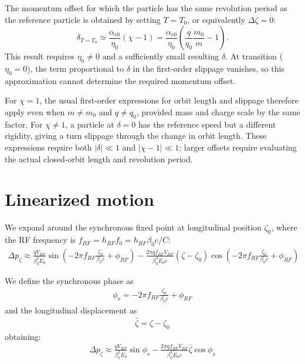 The momentum offset for which the particle has the same revolution period as
the reference particle is obtained by setting $T=T_0$, or equivalently
$\Delta\zeta=0$:
\begin{equation}
\boxed{
\delta_{T=T_0}\simeq\frac{\alpha_{c0}}{\eta_0}(\chi-1)
=\frac{\alpha_{c0}}{\eta_0}
\left(\frac{q}{q_0}\frac{m_0}{m}-1\right).}
\label{eq:species_equal_revolution_period}
\end{equation}
This result requires $\eta_0\ne0$ and a sufficiently small resulting $\delta$.
At transition ($\eta_0=0$), the term proportional to $\delta$ in the first-order
slippage vanishes, so this approximation cannot determine the required
momentum offset.

For $\chi=1$, the usual first-order expressions for orbit length and slippage
therefore apply even when $m\ne m_0$ and $q\ne q_0$, provided mass and charge
scale by the same factor. For $\chi\ne1$, a particle at $\delta=0$ has the
reference speed but a different rigidity, giving a turn slippage through the
change in orbit length. These expressions require both $|\delta|\ll1$ and
$|\chi-1|\ll1$; larger offsets require evaluating the actual closed-orbit
length and revolution period.

\section{Linearized motion}

We expand around the synchronous fixed point at longitudinal position $\zeta_0$, where the RF frequency is $f_{RF} = h_{RF} f_0 = h_{RF}\beta_0 c/C$:
\begin{align}
\Delta p_\zeta \approx \frac{q V_{RF}}{\beta_0^2E_0}\sin\left(-2 \pi f_{RF} \frac{\zeta_0}{\beta_0 c} + \phi_{RF}\right) -\frac{2\pi q f_{RF}V_{RF}}{\beta_0^3 E_0 c}(\zeta-\zeta_0)\cos\left(-2\pi f_{RF} \frac{\zeta_0}{\beta_0 c} + \phi_{RF}\right)
\end{align}

We define the synchronous phase as
\begin{align}
\phi_s = -2 \pi f_{RF} \frac{\zeta_0}{\beta_0 c} + \phi_{RF}
\end{align}
and the longitudinal displacement as
\begin{align}
\bar{\zeta}= \zeta - \zeta_0
\end{align}
obtaining:
\begin{align}
\Delta p_\zeta \approx \frac{q V_{RF}}{\beta_0^2E_0}\sin{\phi_s} -\frac{2\pi q f_{RF} V_{RF}}{\beta_0^3 E_0 c}\bar{\zeta}\cos{\phi_s}
\end{align}

